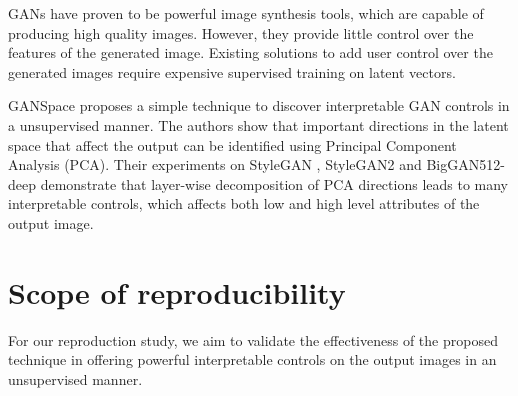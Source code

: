 \documentclass{article}
\begin{document}
GANs have proven to be powerful image synthesis tools, which are capable of producing high quality images. However, they provide little control over the features of the generated image. Existing solutions to add user control over the generated images require expensive supervised training on latent vectors.

GANSpace \cite{ganspace} proposes a simple technique to discover interpretable GAN controls in a unsupervised manner. The authors show that important directions in the latent space that affect the output can be identified using Principal Component Analysis (PCA). Their experiments on StyleGAN \cite{stylegan}, StyleGAN2 \cite{stylegan2} and BigGAN512-deep \cite{biggan} demonstrate that layer-wise decomposition of PCA directions leads to many interpretable controls, which affects both low and high level attributes of the output image.


\section{Scope of reproducibility}
\label{claims}


For our reproduction study, we aim to validate the effectiveness of the proposed technique in offering powerful interpretable controls on the output images in an unsupervised manner.


\end{document}
